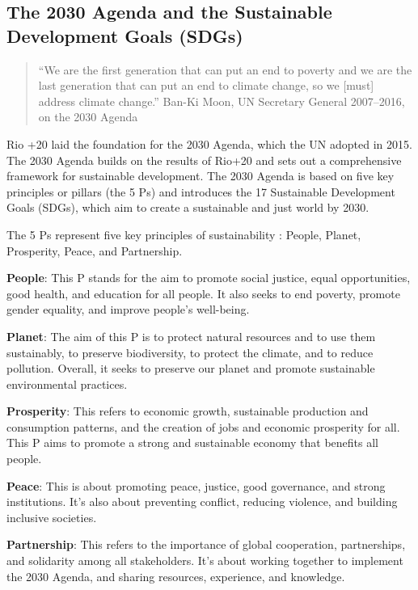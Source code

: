 \documentclass[
  a4paper,
  openany]{book}
\begin{document}
\subsection{The 2030 Agenda and the Sustainable Development Goals
(SDGs)}\label{the-2030-agenda-and-the-sustainable-development-goals-sdgs}

\begin{quote}
``We are the first generation that can put an end to poverty and we are
the last generation that can put an end to climate change, so we
{[}must{]} address climate change.'' Ban-Ki Moon, UN Secretary General
2007--2016, on the 2030 Agenda
\end{quote}

Rio +20 laid the foundation for the 2030 Agenda, which the UN adopted in
2015. The 2030 Agenda builds on the results of Rio+20 and sets out a
comprehensive framework for sustainable development. The 2030 Agenda is
based on five key principles or pillars (the 5 Ps) and introduces the 17
Sustainable Development Goals (SDGs), which aim to create a sustainable
and just world by 2030.

\begin{tcolorbox}[enhanced jigsaw, left=2mm, arc=.35mm, titlerule=0mm, opacityback=0, leftrule=.75mm, title={The 5 Ps of the SDGs}, breakable, bottomtitle=1mm, rightrule=.15mm, coltitle=black, toptitle=1mm, bottomrule=.15mm, colback=white, opacitybacktitle=0.6, colbacktitle=quarto-callout-note-color!10!white, toprule=.15mm, colframe=quarto-callout-note-color-frame]

The 5 Ps represent five key principles of sustainability : People,
Planet, Prosperity, Peace, and Partnership.

\textbf{People}: This P stands for the aim to promote social justice,
equal opportunities, good health, and education for all people. It also
seeks to end poverty, promote gender equality, and improve people's
well-being.

\textbf{Planet}: The aim of this P is to protect natural resources and
to use them sustainably, to preserve biodiversity, to protect the
climate, and to reduce pollution. Overall, it seeks to preserve our
planet and promote sustainable environmental practices.

\textbf{Prosperity}: This refers to economic growth, sustainable
production and consumption patterns, and the creation of jobs and
economic prosperity for all. This P aims to promote a strong and
sustainable economy that benefits all people.

\textbf{Peace}: This is about promoting peace, justice, good governance,
and strong institutions. It's also about preventing conflict, reducing
violence, and building inclusive societies.

\textbf{Partnership}: This refers to the importance of global
cooperation, partnerships, and solidarity among all stakeholders. It's
about working together to implement the 2030 Agenda, and sharing
resources, experience, and knowledge.

\end{tcolorbox}
\end{document}
